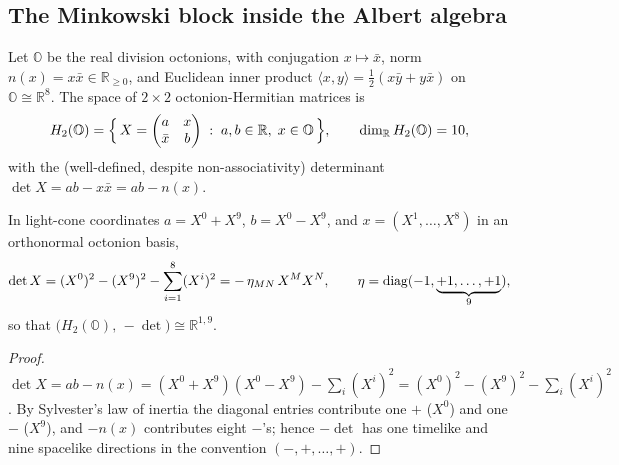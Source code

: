 \subsection{The Minkowski block inside the Albert algebra}
\label{sec:spacetime:block}

Let $\mathbb O$ be the real division octonions, with conjugation $x\mapsto\bar x$,
norm $n(x)=x\bar x\in\mathbb R_{\ge0}$, and Euclidean inner product
$\langle x,y\rangle=\tfrac12(x\bar y+y\bar x)$ on $\mathbb O\cong\mathbb R^8$. The
space of $2\times2$ octonion-Hermitian matrices is
\begin{equation}\label{eq:spacetime:H2O}
  H_2(\mathbb O)=\Bigl\{\,X=\begin{pmatrix} a & x\\ \bar x & b\end{pmatrix}
  \;:\; a,b\in\mathbb R,\; x\in\mathbb O \,\Bigr\},\qquad
  \dim_{\mathbb R}H_2(\mathbb O)=10,
\end{equation}
with the (well-defined, despite non-associativity) determinant
$\det X = ab - x\bar x = ab - n(x)$.

\begin{theorem}
\label{thm:spacetime:minkowski}
In light-cone coordinates $a=X^0+X^9$, $b=X^0-X^9$, and $x=(X^1,\dots,X^8)$ in an
orthonormal octonion basis,
\begin{equation}\label{eq:spacetime:det19}
  \det X = (X^0)^2-(X^9)^2-\sum_{i=1}^{8}(X^i)^2 = -\,\eta_{MN}\,X^M X^N,\qquad
  \eta=\operatorname{diag}(-1,\underbrace{+1,\dots,+1}_{9}),
\end{equation}
so that $\bigl(H_2(\mathbb O),\,-\det\bigr)\cong\mathbb R^{1,9}$.
\end{theorem}
\begin{proof}
$\det X = ab-n(x)=(X^0+X^9)(X^0-X^9)-\sum_i(X^i)^2=(X^0)^2-(X^9)^2-\sum_i(X^i)^2$.
By Sylvester's law of inertia the diagonal entries contribute one $+$ ($X^0$) and one
$-$ ($X^9$), and $-n(x)$ contributes eight $-$'s; hence $-\det$ has one timelike and
nine spacelike directions in the convention $(-,+,\dots,+)$.
\end{proof}

